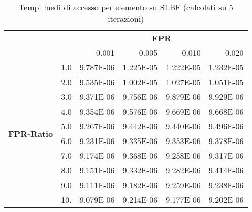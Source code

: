 \documentclass[4apaper,11pt]{report}
\begin{document}
    \begin{table}[H]
        \centering
        \begin{tabular}{llrrrr}
        \toprule
        {} & & \multicolumn{4}{c}{\textbf{FPR}}\\
        {} & &    0.001 &     0.005 &     0.010 &     0.020 \\
        \midrule
        \multirow{10}{*}{\textbf{FPR-Ratio}} &1.0 & 9.787E-06 & 1.225E-05 & 1.222E-05 & 1.232E-05 \\
        &2.0 & 9.535E-06 & 1.002E-05 & 1.027E-05 & 1.051E-05 \\
        &3.0 & 9.371E-06 & 9.756E-06 & 9.879E-06 & 9.929E-06 \\
        &4.0 & 9.354E-06 & 9.576E-06 & 9.669E-06 & 9.668E-06 \\
        &5.0 & 9.267E-06 & 9.442E-06 & 9.440E-06 & 9.496E-06 \\
        &6.0 & 9.231E-06 & 9.335E-06 & 9.353E-06 & 9.378E-06 \\
        &7.0 & 9.174E-06 & 9.368E-06 & 9.258E-06 & 9.317E-06 \\
        &8.0 & 9.151E-06 & 9.332E-06 & 9.282E-06 & 9.414E-06 \\
        &9.0 & 9.111E-06 & 9.182E-06 & 9.259E-06 & 9.238E-06 \\
        &10. & 9.079E-06 & 9.214E-06 & 9.177E-06 & 9.202E-06 \\
        \bottomrule
        \end{tabular}
        \caption{Tempi medi di accesso per elemento su SLBF (calcolati su 5 iterazioni)}
    \end{table}
\end{document}
